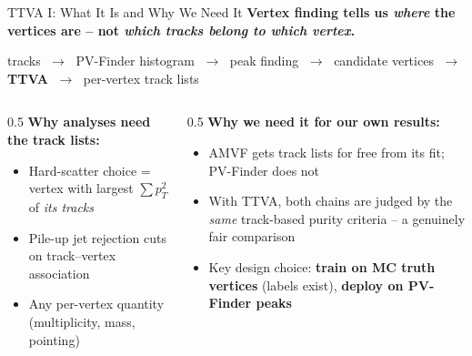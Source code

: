 \documentclass[xcolor=table,aspectratio=169]{beamer}
\begin{document}
\begin{frame}{TTVA I: What It Is and Why We Need It}
    \textbf{Vertex finding tells us \emph{where} the vertices are -- not \emph{which tracks belong to which vertex}.}
    \vspace{0.5em}
    \begin{center}
        tracks \(\;\to\;\) PV-Finder histogram \(\;\to\;\) peak finding \(\;\to\;\) candidate vertices
        \(\;\to\;\) \textcolor{pennred}{\textbf{TTVA}} \(\;\to\;\) per-vertex track lists
    \end{center}
    \vspace{0.5em}
    \begin{columns}[t]
        \begin{column}{0.5\linewidth}
            \textbf{Why analyses need the track lists:}
            \begin{itemize}
                \setlength\itemsep{0.4em}
                \item Hard-scatter choice = vertex with largest \(\sum p_T^2\) of \emph{its tracks}
                \item Pile-up jet rejection cuts on track--vertex association
                \item Any per-vertex quantity (multiplicity, mass, pointing)
            \end{itemize}
        \end{column}
        \begin{column}{0.5\linewidth}
            \textbf{Why we need it for our own results:}
            \begin{itemize}
                \setlength\itemsep{0.4em}
                \item AMVF gets track lists for free from its fit; PV-Finder does not
                \item With TTVA, both chains are judged by the \emph{same} track-based purity criteria -- a genuinely fair comparison
                \item Key design choice: \textbf{train on MC truth vertices} (labels exist), \textbf{deploy on PV-Finder peaks}
            \end{itemize}
        \end{column}
    \end{columns}
\end{frame}
\end{document}
